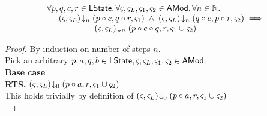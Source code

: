 %
%
\begin{lemma}[]\label{lem:amodMerge}
%
\[
\begin{array}{l}
	\forall p, q, c, r \in \textsf{LState}.\, \forall \varsigma_{}, \varsigma_{L}, \varsigma_{1}, \varsigma_{2} \in \textsf{AMod}.\, \forall n \in \mathbb{N}.\,\\
	\hspace*{0.5cm} \left(\varsigma_{}, \varsigma_{L}\right) \!\downarrow_{n} \left(p \circ c, q \circ r, \varsigma_{1}\right) \;\land\; \left(\varsigma_{}, \varsigma_{L}\right) \!\downarrow_{n} \left(q \circ c, p \circ r, \varsigma_{2}\right)
	\implies\\
	\hspace*{2cm} \left(\varsigma_{}, \varsigma_{L}\right) \!\downarrow_{n} \left(p \circ c \circ q, r, \varsigma_{1} \cup \varsigma_{2}\right)
\end{array}
\]
%
\begin{proof} By induction on number of steps $n$.\\
\noindent Pick an arbitrary $p, a, q, b \in \textsf{LState}, \varsigma_{}, \varsigma_{L}, \varsigma_{1}, \varsigma_{2} \in \textsf{AMod}$.\\
\noindent\textbf{Base case}\\
\textbf{RTS. }\hspace*{0.5cm}$\left(\varsigma_{}, \varsigma_{L}\right) \!\downarrow_{0} \left(p \circ a, r, \varsigma_{1} \cup \varsigma_{2}\right)$\\
This holds trivially by definition of $\left(\varsigma_{}, \varsigma_{L}\right) \!\downarrow_{0} \left(p \circ a, r, \varsigma_{1} \cup \varsigma_{2}\right)$\\


\end{proof}
\end{lemma}
